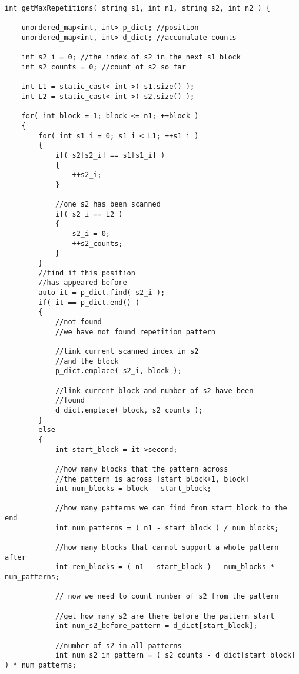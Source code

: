 \setcounter{lstlisting}{0}
\begin{lstlisting}[style=customc, caption={Find Repeat Pattern}]
int getMaxRepetitions( string s1, int n1, string s2, int n2 ) {

    unordered_map<int, int> p_dict; //position
    unordered_map<int, int> d_dict; //accumulate counts

    int s2_i = 0; //the index of s2 in the next s1 block
    int s2_counts = 0; //count of s2 so far

    int L1 = static_cast< int >( s1.size() );
    int L2 = static_cast< int >( s2.size() );

    for( int block = 1; block <= n1; ++block )
    {
        for( int s1_i = 0; s1_i < L1; ++s1_i )
        {
            if( s2[s2_i] == s1[s1_i] )
            {
                ++s2_i;
            }

            //one s2 has been scanned
            if( s2_i == L2 )
            {
                s2_i = 0;
                ++s2_counts;
            }
        }
        //find if this position
        //has appeared before
        auto it = p_dict.find( s2_i );
        if( it == p_dict.end() )
        {
            //not found
            //we have not found repetition pattern

            //link current scanned index in s2
            //and the block
            p_dict.emplace( s2_i, block );

            //link current block and number of s2 have been
            //found
            d_dict.emplace( block, s2_counts );
        }
        else
        {
            int start_block = it->second;

            //how many blocks that the pattern across
            //the pattern is across [start_block+1, block]
            int num_blocks = block - start_block;

            //how many patterns we can find from start_block to the end
            int num_patterns = ( n1 - start_block ) / num_blocks;

            //how many blocks that cannot support a whole pattern after
            int rem_blocks = ( n1 - start_block ) - num_blocks * num_patterns;

            // now we need to count number of s2 from the pattern

            //get how many s2 are there before the pattern start
            int num_s2_before_pattern = d_dict[start_block];

            //number of s2 in all patterns
            int num_s2_in_pattern = ( s2_counts - d_dict[start_block] ) * num_patterns;


\end{lstlisting}
